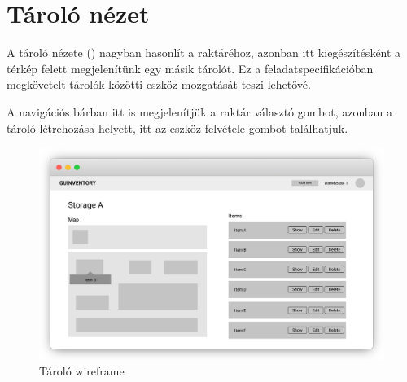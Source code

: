 \section{Tároló nézet}
A tároló nézete () nagyban hasonlít a raktáréhoz, azonban itt kiegészítésként a térkép felett megjelenítünk egy másik tárolót.
Ez a feladatspecifikációban megkövetelt tárolók közötti eszköz mozgatását teszi lehetővé.

A navigációs bárban itt is megjelenítjük a raktár választó gombot, azonban a tároló létrehozása helyett, itt az eszköz felvétele gombot találhatjuk.

\begin{figure}[!ht]
  \centering
  \includegraphics[width=150mm, keepaspectratio]{figures/wireframes/frame_storage.png}
  \caption{Tároló wireframe}
  \label{fig:StorageWireframe}
\end{figure}
  